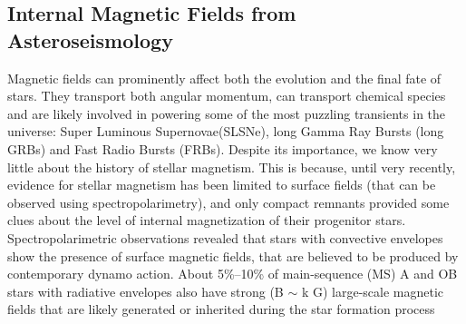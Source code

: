 {\color{red}\subsection{Internal Magnetic Fields from Asteroseismology}}
Magnetic fields can prominently affect both the evolution and the final fate of stars. They transport both angular momentum, can transport chemical species
and are likely involved in powering some of the most puzzling transients in the universe: Super Luminous Supernovae(SLSNe), long Gamma Ray Bursts (long GRBs) and Fast Radio Bursts (FRBs). 
Despite its importance, we know very little about the history of stellar magnetism. This is  because, until very recently, 
evidence for stellar magnetism has been limited to surface fields (that can be observed using spectropolarimetry),
and only compact remnants provided some clues about the level of internal magnetization of their progenitor stars.
Spectropolarimetric observations revealed that stars with convective envelopes show the presence of
surface magnetic fields, that are believed to be produced by contemporary dynamo action.
About 5\%–10\% of main-sequence (MS) A and OB stars with radiative envelopes also have strong (B $\sim$ k G)
large-scale magnetic fields that are likely generated or inherited during the star
formation process  \citep[fossil fields, see e.g.,][]{2012ASPC..464..405W}